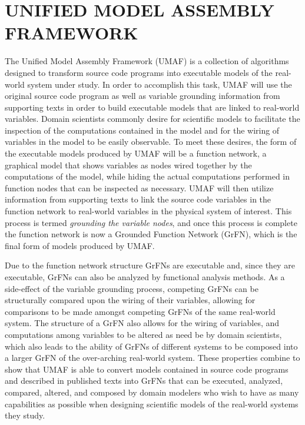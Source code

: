 \chapter{UNIFIED MODEL ASSEMBLY FRAMEWORK\label{chapter:umaf}}
The Unified Model Assembly Framework (UMAF) is a collection of algorithms designed to transform source code programs into executable models of the real-world system under study.
In order to accomplish this task, UMAF will use the original source code program as well as variable grounding information from supporting texts in order to build executable models that are linked to real-world variables.
Domain scientists commonly desire for scientific models to facilitate the inspection of the computations contained in the model and for the wiring of variables in the model to be easily observable.
To meet these desires, the form of the executable models produced by UMAF will be a function network, a graphical model that shows variables as nodes wired together by the computations of the model, while hiding the actual computations performed in function nodes that can be inspected as necessary.
UMAF will then utilize information from supporting texts to link the source code variables in the function network to real-world variables in the physical system of interest.
This process is termed \textit{grounding the variable nodes}, and once this process is complete the function network is now a Grounded Function Network (GrFN), which is the final form of models produced by UMAF.

Due to the function network structure GrFNs are executable and, since they are executable, GrFNs can also be analyzed by functional analysis methods.
As a side-effect of the variable grounding process, competing GrFNs can be structurally compared upon the wiring of their variables, allowing for comparisons to be made amongst competing GrFNs of the same real-world system.
The structure of a GrFN also allows for the wiring of variables, and computations among variables to be altered as need be by domain scientists, which also leads to the ability of GrFNs of different systems to be composed into a larger GrFN of the over-arching real-world system.
These properties combine to show that UMAF is able to convert models contained in source code programs and described in published texts into GrFNs that can be executed, analyzed, compared, altered, and composed by domain modelers who wish to have as many capabilities as possible when designing scientific models of the real-world systems they study.

